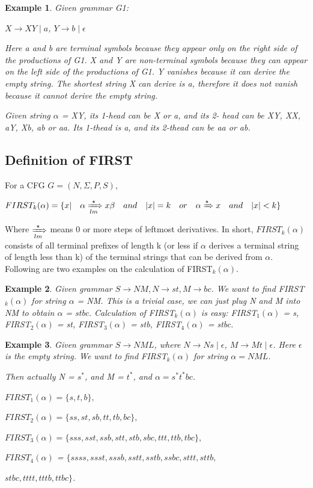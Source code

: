 \documentclass{sig-alternate-05-2015}
\newtheorem{SampleEnv}{Example}[section]
\begin{document}
\begin{SampleEnv}

Given grammar G1: 

$X\rightarrow XY \mid a$, $Y\rightarrow b\mid \epsilon$

Here a and b are terminal symbols because they appear
only on the right side of the productions of G1. X and Y are
non-terminal symbols because they can appear on the left
side of the productions of G1.
Y vanishes because it can derive the empty string. The
shortest string X can derive is a, therefore it does not vanish
because it cannot derive the empty string.

Given string $\alpha$ = XY, its 1-head can be X or a, and its 2-
head can be XY, XX, aY, Xb, ab or aa. Its 1-thead is a, and
its 2-thead can be aa or ab.
\end{SampleEnv}


\subsection{Definition of FIRST}
For a CFG $G = (N, \Sigma, P, S)$,

$FIRST_k(\alpha) = \{x|\quad \alpha \xRightarrow[lm]{\star} x\beta \quad and \quad |x|=k \quad or \quad \alpha \xRightarrow{\star} x \quad and \quad |x|<k \}$

Where $\xRightarrow[lm]{\star}$ means 0 or more steps of leftmost derivatives.
In short, $FIRST_k(\alpha)$ consists of all terminal prefixes of length k (or less if $\alpha$ derives a terminal string of length less than k) of the terminal strings that can be derived from $\alpha$.
Following are two examples on the calculation of FIRST$_k(\alpha)$.

\begin{SampleEnv}
Given grammar $S\rightarrow NM, N\rightarrow st, M\rightarrow bc$.
We want to find FIRST$_k(\alpha)$ for string $\alpha$ = NM. This is a
trivial case, we can just plug N and M into NM to obtain $\alpha$
= stbc. Calculation of FIRST$_k(\alpha)$ is easy: FIRST$_1(\alpha)$ = {s},
FIRST$_2(\alpha)$ = {st}, FIRST$_3(\alpha)$ = {stb}, FIRST$_4(\alpha)$ = {stbc}.
\end{SampleEnv}

\begin{SampleEnv}
Given grammar $S\rightarrow NML$, where $N\rightarrow Ns\mid \epsilon$, $M\rightarrow Mt\mid\epsilon$.
Here $\epsilon$ is the empty string. We want to find FIRST$_k(\alpha)$ for string $\alpha = NML$.

Then actually N = $s^*$, and M = $t^*$, and $\alpha=s^*t^*bc$.

$FIRST_1(\alpha)= \{s,t,b\}, $

$FIRST_2(\alpha)=\{ss,st,sb,tt,tb,bc\}, $

$FIRST_3(\alpha)=\{sss,sst,ssb,stt,stb,sbc,ttt,ttb,tbc\},$

$FIRST_4(\alpha)$ = $\{ssss,ssst,sssb,sstt,sstb,ssbc,sttt,sttb,$

$stbc,tttt,tttb,ttbc\}$.
\end{SampleEnv}
\end{document}
